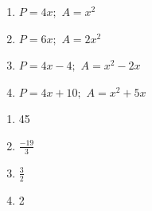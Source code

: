 \begin{respostas}{1}
    \ansitem{} \begin{multicols}{2}
        \begin{enumerate}[label=\alph*)]
            \item $P = 4x;$ $A = x^2$
        
            \item $P = 6x;$ $A = 2x^2$
        
            \item $P = 4x-4;$ $A = x^2-2x$
            
            \item $P = 4x+10;$ $A = x^2+5x$
        \end{enumerate}
    \end{multicols}
    
    
    
    
    
    \ansitem{} \begin{multicols}{4}
        \begin{enumerate}[label=\alph*)]
            \item 45
        
            \item $\frac{-19}{3}$
        
            \item $\frac{3}{2}$
            
            \item 2
        \end{enumerate}
    \end{multicols}
    
\end{respostas}

